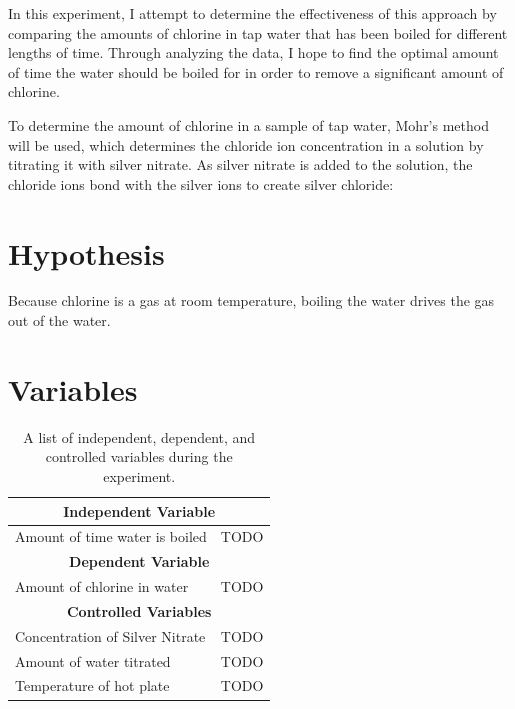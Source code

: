 \documentclass[11pt]{article}
\begin{document}

In this experiment, I attempt to determine the effectiveness of this approach by comparing the amounts of chlorine in tap water that has been boiled for different lengths of time. Through analyzing the data, I hope to find the optimal amount of time the water should be boiled for in order to remove a significant amount of chlorine.

To determine the amount of chlorine in a sample of tap water, Mohr's method will be used, which determines the chloride ion concentration in a solution by titrating it with silver nitrate. As silver nitrate is added to the solution, the chloride ions bond with the silver ions to create silver chloride:

\centerline{}




\section{Hypothesis}
Because chlorine is a gas at room temperature, boiling the water drives the gas out of the water.

\section{Variables}

\begin{table}[H]
	\def\arraystretch{1.5}
	\caption{A list of independent, dependent, and controlled variables during the experiment.}
	\begin{tabularx}{\linewidth}{|X|X|}
		\hline
		\multicolumn{2}{|c|}{\textbf{Independent Variable}}
		\\\hline
		Amount of time water is boiled  &
		TODO
		\\\hline
		\multicolumn{2}{|c|}{\centering \textbf{Dependent Variable}}
		\\\hline
		Amount of chlorine in water     &
		TODO
		\\\hline
		\multicolumn{2}{|c|}{\centering \textbf{Controlled Variables}}
		\\\hline
		Concentration of Silver Nitrate &
		TODO
		\\\hline
		Amount of water titrated        &
		TODO
		\\\hline
		Temperature of hot plate        &
		TODO
		\\\hline
	\end{tabularx}
\end{table}
\end{document}
